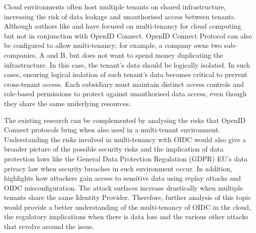 Cloud environments often host multiple tenants on shared infrastructure, increasing the risk of data leakage and unauthorised access between tenants. Although authors like \cite{multi_tenancy_cloud_risk} and \cite{cloud_shared_resp} have focused on multi-tenancy for cloud computing but not in conjunction with OpenID Connect. OpenID Connect Protocol can also be configured to allow multi-tenancy; for example, a company owns two sub-companies, A and B, but does not want to spend money duplicating the infrastructure. In this case, the tenant's data should be logically isolated. In such cases, ensuring logical isolation of each tenant's data becomes critical to prevent cross-tenant access. Each subsidiary must maintain distinct access controls and role-based permissions to protect against unauthorised data access, even though they share the same underlying resources. 

The existing research can be complemented by analysing the risks that OpenID Connect protocols bring when also used in a multi-tenant environment. Understanding the risks involved in multi-tenancy with OIDC would also give a broader picture of the possible security risks and the implication of data protection laws like the General Data Protection Regulation (GDPR) EU's data privacy law \citep{gdpr} when security breaches in such environment occur. In addition, \citep{oidc_attacks} highlights how attackers gain access to sensitive data using replay attacks and OIDC misconfiguration. The attack surfaces increase drastically when multiple tenants share the same Identity Provider. Therefore, further analysis of this topic would provide a better understanding of the multi-tenancy of OIDC in the cloud, the regulatory implications when there is data loss and the various other attacks that revolve around the issue.

